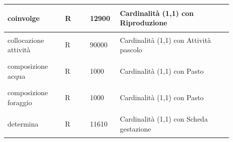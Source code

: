 \documentclass[12pt,a4paper]{article}
\begin{document}
\begin{center}
\begin{longtable}{|p{0.23\linewidth}|p{0.1\linewidth}|p{0.11\linewidth}|p{0.45\linewidth}|}
\hline
coinvolge 				& \begin{center}
\vspace{-25pt}R
\end{center}
					& \begin{center}
					\vspace{-25pt}12900\end{center}
					&  Cardinalità (1,1) con Riproduzione \\ 

\hline
collocazione attività 				& \begin{center}
\vspace{-25pt}R
\end{center}
					& \begin{center}
					\vspace{-25pt}90000\end{center}
					&  Cardinalità (1,1) con Attività pascolo \\ 

\hline
composizione acqua 				& \begin{center}
\vspace{-25pt}R
\end{center}
					& \begin{center}
					\vspace{-25pt}1000\end{center}
					&  Cardinalità (1,1) con Pasto \\ 

\hline
composizione foraggio 				& \begin{center}
\vspace{-25pt}R
\end{center}
					& \begin{center}
					\vspace{-25pt}1000\end{center}
					&  Cardinalità (1,1) con Pasto \\ 


\hline
determina 				& \begin{center}
\vspace{-25pt}R
\end{center}
					& \begin{center}
					\vspace{-25pt}11610\end{center}
					&  Cardinalità (1,1) con Scheda gestazione \\ 


\end{longtable}
\end{center}
\end{document}

